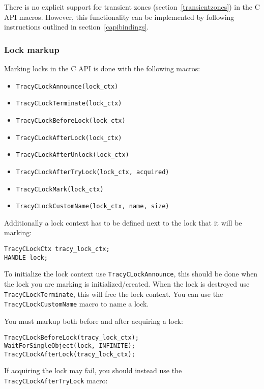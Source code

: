 \documentclass[hidelinks,titlepage,a4paper,twoside]{article}
\begin{document}
There is no explicit support for transient zones (section~\ref{transientzones}) in the C API macros. However, this functionality can be implemented by following instructions outlined in section~\ref{capibindings}.

\subsubsection{Lock markup}

Marking locks in the C API is done with the following macros:

\begin{itemize}
\item \texttt{TracyCLockAnnounce(lock\_ctx)}
\item \texttt{TracyCLockTerminate(lock\_ctx)}
\item \texttt{TracyCLockBeforeLock(lock\_ctx)}
\item \texttt{TracyCLockAfterLock(lock\_ctx)}
\item \texttt{TracyCLockAfterUnlock(lock\_ctx)}
\item \texttt{TracyCLockAfterTryLock(lock\_ctx, acquired)}
\item \texttt{TracyCLockMark(lock\_ctx)}
\item \texttt{TracyCLockCustomName(lock\_ctx, name, size)}
\end{itemize}

Additionally a lock context has to be defined next to the lock that it will be marking:

\begin{lstlisting}
TracyCLockCtx tracy_lock_ctx;
HANDLE lock;
\end{lstlisting}

To initialize the lock context use \texttt{TracyCLockAnnounce}, this should be done when the lock you are marking is initialized/created. When the lock is destroyed use \texttt{TracyCLockTerminate}, this will free the lock context. You can use the \texttt{TracyCLockCustomName} macro to name a lock.

You must markup both before and after acquiring a lock:

\begin{lstlisting}
TracyCLockBeforeLock(tracy_lock_ctx);
WaitForSingleObject(lock, INFINITE);
TracyCLockAfterLock(tracy_lock_ctx);
\end{lstlisting}

If acquiring the lock may fail, you should instead use the \texttt{TracyCLockAfterTryLock} macro:
\end{document}
